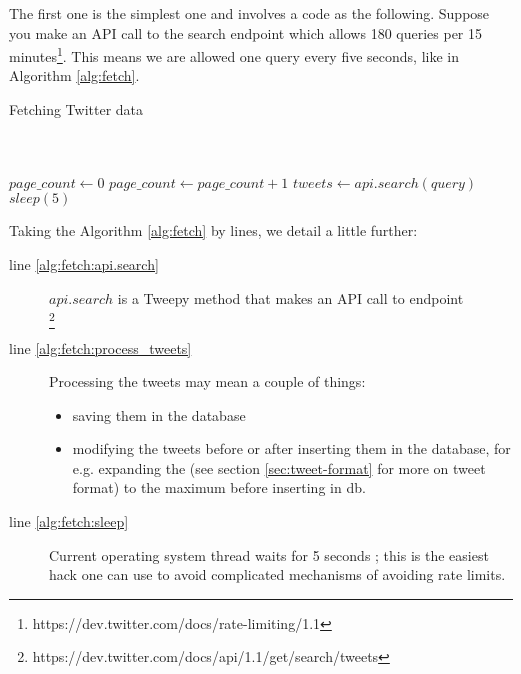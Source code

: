 The first one is the simplest one and involves a code as the following. Suppose you make an API call to the search endpoint which allows 180 queries per 15 minutes\footnote{\label{fn:rate-limit}https://dev.twitter.com/docs/rate-limiting/1.1}. This means we are allowed one query every five seconds, like in Algorithm \ref{alg:fetch}.

\begin{algorithm}
\caption{Fetching Twitter data}\label{alg:fetch}
\begin{algorithmic}[1]
\\ 
\\ 
\State $page\_count \gets 0$
	\State $page\_count \gets page\_count + 1$
    \State $tweets \gets api.search(query)$\label{alg:fetch:api.search}
    \State {}\label{alg:fetch:process_tweets}
    \State {}
    \State $sleep(5)$\label{alg:fetch:sleep}
\EndWhile
\EndProcedure
\end{algorithmic}
\end{algorithm}

Taking the Algorithm \ref{alg:fetch} by lines, we detail a little further:
\begin{description}
   	\item[line \ref{alg:fetch:api.search}] $api.search$ is a Tweepy method that makes an API call to endpoint\\ \footnote{\label{fn:twitter-search-api}https://dev.twitter.com/docs/api/1.1/get/search/tweets}
   	\item[line \ref{alg:fetch:process_tweets}] Processing the tweets may mean a couple of things:
    \begin{itemize}
    	\item saving them in the database
        \item modifying the tweets before or after inserting them in the database, for e.g. expanding the  (see section \ref{sec:tweet-format} for more on tweet format) to the maximum before inserting in db.
    \end{itemize}
	\item[line \ref{alg:fetch:sleep}] Current operating system thread waits for 5 seconds ; this is the easiest hack one can use to avoid complicated mechanisms of avoiding rate limits.
\end{description}

